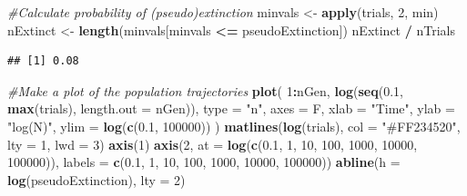 \documentclass[
  a4paper]{book}
\newenvironment{Shaded}{\begin{snugshade}}{\end{snugshade}}
\newcommand{\AttributeTok}[1]{\textcolor[rgb]{0.13,0.29,0.53}{#1}}
\newcommand{\CommentTok}[1]{\textcolor[rgb]{0.56,0.35,0.01}{\textit{#1}}}
\newcommand{\DecValTok}[1]{\textcolor[rgb]{0.00,0.00,0.81}{#1}}
\newcommand{\FloatTok}[1]{\textcolor[rgb]{0.00,0.00,0.81}{#1}}
\newcommand{\FunctionTok}[1]{\textcolor[rgb]{0.13,0.29,0.53}{\textbf{#1}}}
\newcommand{\NormalTok}[1]{#1}
\newcommand{\OtherTok}[1]{\textcolor[rgb]{0.56,0.35,0.01}{#1}}
\newcommand{\SpecialCharTok}[1]{\textcolor[rgb]{0.81,0.36,0.00}{\textbf{#1}}}
\newcommand{\StringTok}[1]{\textcolor[rgb]{0.31,0.60,0.02}{#1}}
\begin{document}
\begin{Shaded}
\begin{Highlighting}[]
\CommentTok{\#Calculate probability of (pseudo)extinction}
\NormalTok{minvals }\OtherTok{\textless{}{-}} \FunctionTok{apply}\NormalTok{(trials, }\DecValTok{2}\NormalTok{, min)}
\NormalTok{nExtinct }\OtherTok{\textless{}{-}} \FunctionTok{length}\NormalTok{(minvals[minvals }\SpecialCharTok{\textless{}=}\NormalTok{ pseudoExtinction])}
\NormalTok{nExtinct }\SpecialCharTok{/}\NormalTok{ nTrials}
\end{Highlighting}
\end{Shaded}

\begin{verbatim}
## [1] 0.08
\end{verbatim}

\begin{Shaded}
\begin{Highlighting}[]
\CommentTok{\#Make a plot of the population trajectories}
\FunctionTok{plot}\NormalTok{(}
  \DecValTok{1}\SpecialCharTok{:}\NormalTok{nGen,}
  \FunctionTok{log}\NormalTok{(}\FunctionTok{seq}\NormalTok{(}\FloatTok{0.1}\NormalTok{, }\FunctionTok{max}\NormalTok{(trials), }\AttributeTok{length.out =}\NormalTok{ nGen)),}
  \AttributeTok{type =} \StringTok{"n"}\NormalTok{,}
  \AttributeTok{axes =}\NormalTok{ F,}
  \AttributeTok{xlab =} \StringTok{"Time"}\NormalTok{,}
  \AttributeTok{ylab =} \StringTok{"log(N)"}\NormalTok{,}
  \AttributeTok{ylim =} \FunctionTok{log}\NormalTok{(}\FunctionTok{c}\NormalTok{(}\FloatTok{0.1}\NormalTok{, }\DecValTok{100000}\NormalTok{))}
\NormalTok{)}
\FunctionTok{matlines}\NormalTok{(}\FunctionTok{log}\NormalTok{(trials),}
         \AttributeTok{col =} \StringTok{"\#FF234520"}\NormalTok{,}
         \AttributeTok{lty =} \DecValTok{1}\NormalTok{,}
         \AttributeTok{lwd =} \DecValTok{3}\NormalTok{)}
\FunctionTok{axis}\NormalTok{(}\DecValTok{1}\NormalTok{)}
\FunctionTok{axis}\NormalTok{(}\DecValTok{2}\NormalTok{,}
     \AttributeTok{at =} \FunctionTok{log}\NormalTok{(}\FunctionTok{c}\NormalTok{(}\FloatTok{0.1}\NormalTok{, }\DecValTok{1}\NormalTok{, }\DecValTok{10}\NormalTok{, }\DecValTok{100}\NormalTok{, }\DecValTok{1000}\NormalTok{, }\DecValTok{10000}\NormalTok{, }\DecValTok{100000}\NormalTok{)),}
     \AttributeTok{labels =} \FunctionTok{c}\NormalTok{(}\FloatTok{0.1}\NormalTok{, }\DecValTok{1}\NormalTok{, }\DecValTok{10}\NormalTok{, }\DecValTok{100}\NormalTok{, }\DecValTok{1000}\NormalTok{, }\DecValTok{10000}\NormalTok{, }\DecValTok{100000}\NormalTok{))}
\FunctionTok{abline}\NormalTok{(}\AttributeTok{h =} \FunctionTok{log}\NormalTok{(pseudoExtinction), }\AttributeTok{lty =} \DecValTok{2}\NormalTok{)}
\end{Highlighting}
\end{Shaded}
\end{document}
